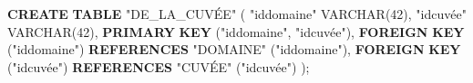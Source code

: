 \documentclass[11pt]{article}
\newenvironment{Shaded}{}{}
\newcommand{\KeywordTok}[1]{\textcolor[rgb]{0.00,0.44,0.13}{\textbf{{#1}}}}
\newcommand{\DataTypeTok}[1]{\textcolor[rgb]{0.56,0.13,0.00}{{#1}}}
\newcommand{\DecValTok}[1]{\textcolor[rgb]{0.25,0.63,0.44}{{#1}}}
\newcommand{\OtherTok}[1]{\textcolor[rgb]{0.00,0.44,0.13}{{#1}}}
\newcommand{\NormalTok}[1]{{#1}}
\begin{document}
\begin{Shaded}
\begin{Highlighting}[]
\KeywordTok{CREATE} \KeywordTok{TABLE} \OtherTok{"DE\_LA\_CUVÉE"}\NormalTok{ (}
  \OtherTok{"iddomaine"} \DataTypeTok{VARCHAR}\NormalTok{(}\DecValTok{42}\NormalTok{),}
  \OtherTok{"idcuvée"} \DataTypeTok{VARCHAR}\NormalTok{(}\DecValTok{42}\NormalTok{),}
  \KeywordTok{PRIMARY} \KeywordTok{KEY}\NormalTok{ (}\OtherTok{"iddomaine"}\NormalTok{, }\OtherTok{"idcuvée"}\NormalTok{),}
  \KeywordTok{FOREIGN} \KeywordTok{KEY}\NormalTok{ (}\OtherTok{"iddomaine"}\NormalTok{) }\KeywordTok{REFERENCES} \OtherTok{"DOMAINE"}\NormalTok{ (}\OtherTok{"iddomaine"}\NormalTok{),}
  \KeywordTok{FOREIGN} \KeywordTok{KEY}\NormalTok{ (}\OtherTok{"idcuvée"}\NormalTok{) }\KeywordTok{REFERENCES} \OtherTok{"CUVÉE"}\NormalTok{ (}\OtherTok{"idcuvée"}\NormalTok{)}
\NormalTok{);}
\end{Highlighting}
\end{Shaded}
\end{document}
